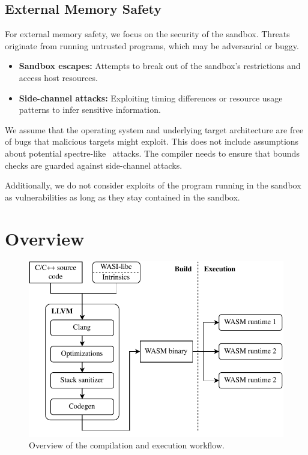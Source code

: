 \subsection{External Memory Safety}
\label{subsec:external-memory-safety}

For external memory safety, we focus on the security of the sandbox.
Threats originate from running untrusted programs, which may be adversarial or buggy.

\begin{itemize}
    \item \textbf{Sandbox escapes:} Attempts to break out of the sandbox's restrictions and access host resources.
    \item \textbf{Side-channel attacks:} Exploiting timing differences or resource usage patterns to infer sensitive information.
\end{itemize}

\noindent
We assume that the operating system and underlying target architecture are free of bugs that malicious targets might exploit.
This does not include assumptions about potential spectre-like~\cite{kocher2020spectre} attacks.
The compiler needs to ensure that bounds checks are guarded against side-channel attacks.

Additionally, we do not consider exploits of the program running in the sandbox as vulnerabilities as long as they stay contained in the sandbox.


\section{Overview}
\label{sec:overview}

\begin{figure}[t]
    \centering
    \includegraphics{figures/build/overview}
    \caption{Overview of the compilation and execution workflow.}
    \label{fig:overview}
\end{figure}


